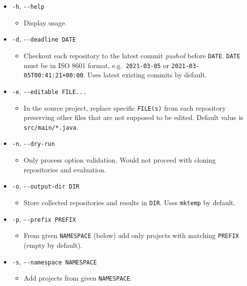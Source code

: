 \begin{itemize}
\item
  \texttt{-h}, \texttt{-\/-help}

  \begin{itemize}
  \item
    Display usage.
  \end{itemize}
\item
  \texttt{-d}, \texttt{-\/-deadline\ DATE}

  \begin{itemize}
  \item
    Checkout each repository to the latest commit \emph{pushed} before \texttt{DATE}. \texttt{DATE} must be in ISO 8601 format, e.g.~\texttt{2021-03-05} or \texttt{2021-03-05T00:41:21+00:00}. Uses latest existing commits by default.
  \end{itemize}
\item
  \texttt{-e}, \texttt{-\/-editable\ FILE...}

  \begin{itemize}
  \item
    In the source project, replace specific \texttt{FILE(s)} from each repository preserving other files that are not supposed to be edited. Default value is \texttt{src/main/*.java}.
  \end{itemize}
\item
  \texttt{-n}, \texttt{-\/-dry-run}

  \begin{itemize}
  \item
    Only process option validation. Would not proceed with cloning repositories and evaluation.
  \end{itemize}
\item
  \texttt{-o}, \texttt{-\/-output-dir\ DIR}

  \begin{itemize}
  \item
    Store collected repositories and results in \texttt{DIR}. Uses \texttt{mktemp} by default.
  \end{itemize}
\item
  \texttt{-p}, \texttt{-\/-prefix\ PREFIX}

  \begin{itemize}
  \item
    From given \texttt{NAMESPACE} (below) add only projects with matching \texttt{PREFIX} (empty by default).
  \end{itemize}
\item
  \texttt{-s}, \texttt{-\/-namespace\ NAMESPACE}

  \begin{itemize}
  \item
    Add projects from given \texttt{NAMESPACE}.
  \end{itemize}
\end{itemize}

